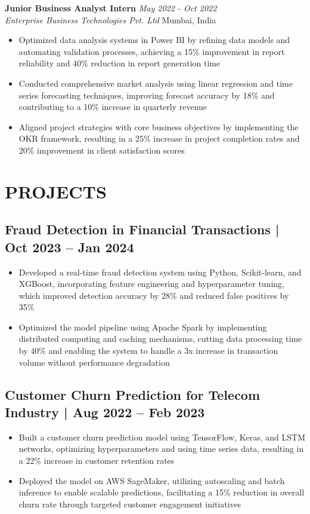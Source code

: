 \documentclass[11pt,a4paper]{article}
\newcommand{\workexp}[4]{
  \textbf{#1} \hfill \textit{#2}\\
  \textit{#3} \hfill #4\\
}
\begin{document}
\workexp{Junior Business Analyst Intern}{May 2022 - Oct 2022}{Enterprise Business Technologies Pvt. Ltd}{Mumbai, India}
\begin{itemize}[leftmargin=*,noitemsep,topsep=0pt]
\item Optimized data analysis systems in Power BI by refining data models and automating validation processes, achieving a 15\% improvement in report reliability and 40\% reduction in report generation time
\item Conducted comprehensive market analysis using linear regression and time series forecasting techniques, improving forecast accuracy by 18\% and contributing to a 10\% increase in quarterly revenue
\item Aligned project strategies with core business objectives by implementing the OKR framework, resulting in a 25\% increase in project completion rates and 20\% improvement in client satisfaction scores
\end{itemize}

\section*{PROJECTS}
\subsection*{Fraud Detection in Financial Transactions | Oct 2023 – Jan 2024}
\begin{itemize}[leftmargin=*,noitemsep,topsep=0pt]
\item Developed a real-time fraud detection system using Python, Scikit-learn, and XGBoost, incorporating feature engineering and hyperparameter tuning, which improved detection accuracy by 28\% and reduced false positives by 35\%
\item Optimized the model pipeline using Apache Spark by implementing distributed computing and caching mechanisms, cutting data processing time by 40\% and enabling the system to handle a 3x increase in transaction volume without performance degradation
\end{itemize}

\subsection*{Customer Churn Prediction for Telecom Industry | Aug 2022 – Feb 2023}
\begin{itemize}[leftmargin=*,noitemsep,topsep=0pt]
\item Built a customer churn prediction model using TensorFlow, Keras, and LSTM networks, optimizing hyperparameters and using time series data, resulting in a 22\% increase in customer retention rates
\item Deployed the model on AWS SageMaker, utilizing autoscaling and batch inference to enable scalable predictions, facilitating a 15\% reduction in overall churn rate through targeted customer engagement initiatives
\end{itemize}
\end{document}
